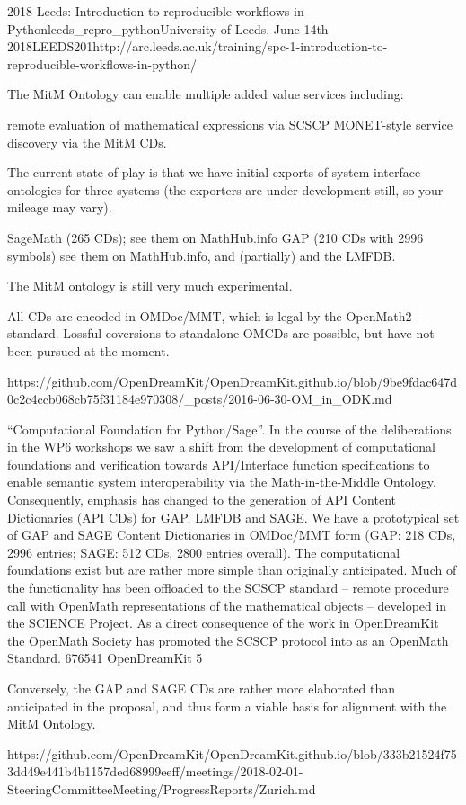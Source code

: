 \begin{Aim 1}
\begin{Aim 2}
\begin{event}{2018 Leeds: Introduction to reproducible workflows in Python}{leeds_repro_python}{University of Leeds, June 14th 2018}{LEEDS}{20}{1}{http://arc.leeds.ac.uk/training/spc-1-introduction-to-reproducible-workflows-in-python/}
\begin{itemize}
The MitM Ontology can enable multiple added value services including:

    remote evaluation of mathematical expressions via SCSCP
    MONET-style service discovery via the MitM CDs.

The current state of play is that we have initial exports of system interface ontologies for three systems (the exporters are under development still, so your mileage may vary).

    SageMath (265 CDs); see them on MathHub.info
    GAP (210 CDs with 2996 symbols) see them on MathHub.info, and
    (partially) and the LMFDB.

The MitM ontology is still very much experimental.

All CDs are encoded in OMDoc/MMT, which is legal by the OpenMath2 standard. Lossful coversions to standalone OMCDs are possible, but have not been pursued at the moment.

https://github.com/OpenDreamKit/OpenDreamKit.github.io/blob/9be9fdac647d0c2c4ccb068cb75f31184e970308/_posts/2016-06-30-OM_in_ODK.md


“Computational Foundation for Python/Sage”. In the course of the deliberations in the WP6 workshops we saw a shift from the development of computational foundations and verification towards API/Interface function specifications to enable semantic system interoperability via the Math-in-the-Middle Ontology. Consequently, emphasis has changed to the generation of API Content Dictionaries (API CDs) for GAP, LMFDB and SAGE. We have a prototypical set of GAP and SAGE Content Dictionaries in OMDoc/MMT form (GAP: 218 CDs, 2996 entries; SAGE: 512 CDs, 2800 entries overall). The computational foundations exist but are rather more simple than originally anticipated. Much of the functionality has been offloaded to the SCSCP standard – remote procedure call with OpenMath representations of the mathematical objects – developed in the SCIENCE Project. As a direct consequence of the work in OpenDreamKit the OpenMath Society has promoted the SCSCP protocol into as an OpenMath Standard. 676541 OpenDreamKit 5

Conversely, the GAP and SAGE CDs are rather more elaborated than anticipated in the proposal, and thus form a viable basis for alignment with the MitM Ontology.

  https://github.com/OpenDreamKit/OpenDreamKit.github.io/blob/333b21524f753dd49e441b4b1157ded68999eeff/meetings/2018-02-01-SteeringCommitteeMeeting/ProgressReports/Zurich.md
  

\end{itemize}
\end{event}
\end{Aim 2}
\end{Aim 1}
